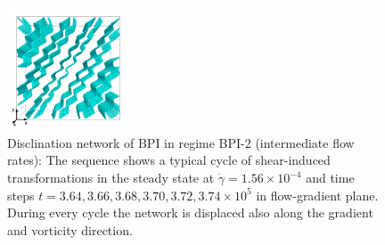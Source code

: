 \documentclass[8.5pt,twoside,twocolumn]{article}
\newcommand{\e}[1]{\times10^{#1}}
\newcommand{\gd}{\dot{\gamma}}
\begin{document}
\begin{figure}[htpb]
\includegraphics[width=0.32\textwidth]{disc-374k_run914r.png}
\caption{Disclination network of BPI in regime BPI-2 (intermediate flow rates): 
The sequence shows a typical cycle of shear-induced transformations in the 
steady state at $\gd=1.56\e{-4}$ and time steps 
$t=3.64, 3.66,3.68,3.70,3.72,3.74\e{5}$ in flow-gradient plane. 
During every cycle the network is displaced also along the gradient and vorticity direction.}
\label{bp1-med}
\end{figure}
\end{document}
